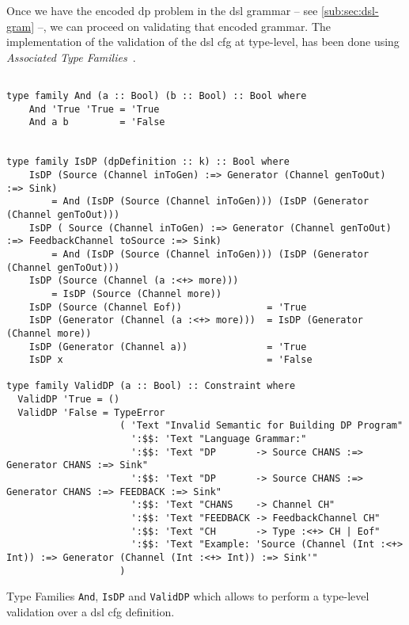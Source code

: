 Once we have the encoded \acrshort{dp} problem in the \acrshort{dsl} grammar -- see \autoref{sub:sec:dsl-gram} --, we can proceed on validating that encoded grammar. 
The implementation of the validation of the \acrshort{dsl} \acrshort{cfg} at type-level, has been done using \emph{Associated Type Families}~\cite{associated-types}.

\begin{listing}[htp!]
  \begin{verbatim}

type family And (a :: Bool) (b :: Bool) :: Bool where
    And 'True 'True = 'True
    And a b         = 'False
  

type family IsDP (dpDefinition :: k) :: Bool where
    IsDP (Source (Channel inToGen) :=> Generator (Channel genToOut) :=> Sink)
        = And (IsDP (Source (Channel inToGen))) (IsDP (Generator (Channel genToOut)))
    IsDP ( Source (Channel inToGen) :=> Generator (Channel genToOut) :=> FeedbackChannel toSource :=> Sink)
        = And (IsDP (Source (Channel inToGen))) (IsDP (Generator (Channel genToOut)))
    IsDP (Source (Channel (a :<+> more)))     
        = IsDP (Source (Channel more))
    IsDP (Source (Channel Eof))               = 'True
    IsDP (Generator (Channel (a :<+> more)))  = IsDP (Generator (Channel more))
    IsDP (Generator (Channel a))              = 'True
    IsDP x                                    = 'False
     
type family ValidDP (a :: Bool) :: Constraint where
  ValidDP 'True = ()
  ValidDP 'False = TypeError
                    ( 'Text "Invalid Semantic for Building DP Program"
                      ':$$: 'Text "Language Grammar:"
                      ':$$: 'Text "DP       -> Source CHANS :=> Generator CHANS :=> Sink"
                      ':$$: 'Text "DP       -> Source CHANS :=> Generator CHANS :=> FEEDBACK :=> Sink"
                      ':$$: 'Text "CHANS    -> Channel CH"
                      ':$$: 'Text "FEEDBACK -> FeedbackChannel CH"
                      ':$$: 'Text "CH       -> Type :<+> CH | Eof"
                      ':$$: 'Text "Example: 'Source (Channel (Int :<+> Int)) :=> Generator (Channel (Int :<+> Int)) :=> Sink'"
                    )
  \end{verbatim}
  \caption[{[\texttt{Stage.hs}] Validating encoded in $G_{dsl}$ - FCF}]{Type Families \texttt{And}, \texttt{IsDP} and \texttt{ValidDP} which allows to perform a type-level validation over a \acrshort{dsl} \acrshort{cfg} definition.}
  \label{src:dpfh:4}
\end{listing}

